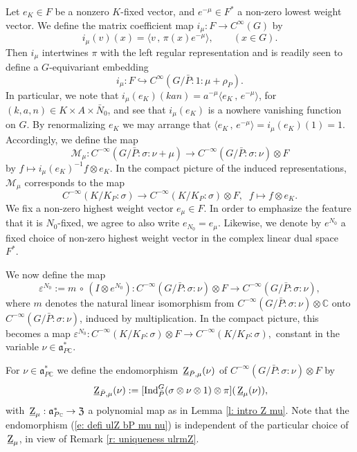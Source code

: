 \documentclass[12pt,a4paper]{article}
\def\qquad{\quad\quad}
\def\msy#1{{\mathbb #1}}
\def\C{{\msy C}}
\def\ge{\varepsilon}
\def\gs{\sigma}
\def\got#1{\mathfrak #1}
\def\fa{{\got a}}
\def\to{\rightarrow}
\def\inp#1#2{\langle#1\,,\,#2\rangle}
\def\after{\,{\scriptstyle\circ}\,}
\def\iC{{\scriptscriptstyle \C}}
\def\cM{{\mathcal M}}
\numberwithin{Thm}{section}
\numberwithin{equation}{section}
\def\Ind{{\rm Ind}}
\def\fZ{{\mathfrak Z}}
\def\embeds{\hookrightarrow}
\def\faPdc{{\fa_{P\iC}^*}}
\numberwithin{equation}{section}
\def\fZ{{\mathfrak Z}}
\def\faPdc{\fa_{P\iC}^*}
\def\ulrmZ{\,\underline{\rm Z}_\mu}
\def\ulZ{\, \underline{\rm Z}}
\begin{document}
Let 
$e_K \in F$ be a nonzero $K$-fixed vector, and
$e^{-\mu} \in F^*$ a non-zero lowest weight  vector. 
We define the matrix coefficient map $i_\mu: F \to C^\infty(G)$ 
by
\begin{equation}
\label{e: intro e min mu}
i_\mu(v)(x) = \inp{v}{\pi(x) e^{-\mu}} ,\qquad (x \in G).
\end{equation}  
Then $i_\mu$ intertwines $\pi$ with the left regular representation 
and is readily seen to define a $G$-equivariant embedding
\begin{equation}
\label{e: embedding i mu}
i_\mu: F \embeds C^\infty(G/\bar P : 1 : \mu + \rho_P).
\end{equation} 
In particular, we note that $i_\mu(e_K)(kan) = a^{-\mu}\inp{e_K}{e^{-\mu}}$, 
for $(k , a, n) \in K \times A \times \bar N_0$, and see that $i_\mu(e_K)$ 
is a nowhere vanishing function on $G.$  By renormalizing $e_K$ we may arrange 
that $\inp{e_K}{e^{-\mu}} = i_\mu(e_K)(1) = 1.$ 
Accordingly, we define the map 
\begin{equation}
\label{e: defi M mu} 
\cM_\mu : C^{-\infty}(G/\bar P: \gs: \nu + \mu) \to C^{-\infty}(G/\bar P : \gs: \nu) \otimes F\end{equation}
by $ f \mapsto i_\mu(e_K)^{-1} f \otimes e_K.$ 
In the compact picture of the induced representations,
$\cM_\mu$ corresponds to the map 
$$ 
C^{-\infty}(K/K_P:\gs) \to 
C^{-\infty}(K/K_P:\gs)\otimes F, \;\; f \mapsto f \otimes e_K.
$$%
We fix a non-zero highest weight vector $e_\mu \in F.$ In order to emphasize
the feature that it is $N_0$-fixed, we agree to also write 
$e_{N_0} = e_{\mu}.$
 Likewise, we
denote by $e^{N_0}$ a fixed choice of non-zero highest weight vector in 
the complex linear dual space
$F^*.$ 

 We now define
the map 
\begin{equation}
\label{e: defi ge N zero}
\ge^{N_0} := m \after (I \otimes e^{N_0}): C^{-\infty}(G/\bar P:\gs: \nu) \otimes F \to 
C^{-\infty}(G/\bar P:\gs: \nu),
\end{equation}  
where $m$ denotes the natural linear isomorphism  
from 
$C^{-\infty}(G/\bar P:\gs: \nu) \otimes \C$ onto $C^{-\infty}(G/\bar P:\gs: \nu)$,
induced by multiplication. In the compact picture, this becomes a map 
$
\ge^{N_0}: C^{-\infty}(K/K_P:\gs) \otimes F \to  C^{-\infty}(K/K_P: \gs),
$ 
constant in the variable $\nu \in \faPdc.$ 

For $\nu \in \faPdc$ we define the endomorphism $\ulZ_{\bar P, \mu}(\nu)$ of $C^{-\infty}(G/\bar P : \gs: \nu )\otimes F$ by 
\begin{equation}
\label{e: defi ulZ bP mu nu} 
\ulZ_{\bar P,\mu}(\nu): = [\Ind_{\bar P}^G(\gs\otimes \nu \otimes 1) \otimes \pi](\ulrmZ(\nu)),
\end{equation} 
with $\ulrmZ: \faPdc \to \fZ$ a polynomial map as in Lemma \ref{l: intro Z mu}. Note that
the endomorphism (\ref{e: defi ulZ bP mu nu}) is independent of the particular choice
of $\ulrmZ$, in view of Remark \ref{r: uniqueness ulrmZ}.
\end{document}
